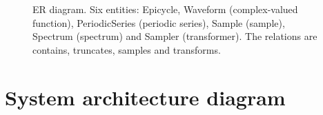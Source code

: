 \begin{figure}[htbp]
    \caption{ER diagram. Six entities: Epicycle, Waveform (complex-valued function), PeriodicSeries (periodic series), Sample (sample), Spectrum (spectrum) and Sampler (transformer). The relations are contains, truncates, samples and transforms.}
    \label{fig:er_diagram}
\end{figure}

\newpage

\section{System architecture diagram}

